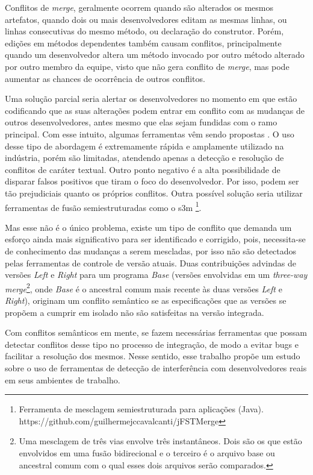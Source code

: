 \documentclass[sigconf,review]{acmart}
\begin{document}
Conflitos de \textit{merge}, geralmente ocorrem quando são alterados os mesmos artefatos, quando dois ou mais desenvolvedores editam as mesmas linhas, ou linhas consecutivas do mesmo método, ou declaração do construtor\cite{accioly2018understanding}. Porém, edições em métodos dependentes também causam conflitos, principalmente quando um desenvolvedor altera um método invocado por outro método alterado por outro membro da equipe, visto que não gera conflito de \textit{merge}, mas pode aumentar as chances de ocorrência de outros conflitos\cite{lima2014abordagem}.

Uma solução parcial seria alertar os desenvolvedores no momento em que estão codificando que as suas alterações podem entrar em conflito com as mudanças de outros desenvolvedores, antes mesmo que elas sejam fundidas com o ramo principal. Com esse intuito, algumas ferramentas vêm sendo propostas \cite{10.1145/1810295.1810339, 10.1145/2025113.2025139, article, 10.5555/2486788.2486884}. O uso desse tipo de abordagem é extremamente rápida e amplamente utilizado na indústria, porém são limitadas, atendendo apenas a detecção e resolução de conflitos de caráter textual. Outro ponto negativo é a alta possibilidade de disparar falsos positivos que tiram o foco do desenvolvedor. Por isso, podem ser tão prejudiciais quanto os próprios conflitos. Outra possível solução seria utilizar ferramentas de fusão semiestruturadas como o s3m \footnote{Ferramenta de mesclagem semiestruturada para aplicações (Java). https://github.com/guilhermejccavalcanti/jFSTMerge}. 


Mas esse não é o único problema, existe um tipo de conflito que demanda um esforço ainda mais significativo para ser identificado e corrigido,  pois, necessita-se de conhecimento das mudanças a serem mescladas, por isso não são detectados pelas ferramentas de controle de versão atuais. Duas contribuições advindas de versões \emph{Left} e \emph{Right} para um programa \emph{Base} (versões envolvidas em um \emph{three-way merge}\footnote{Uma mesclagem de três vias envolve três instantâneos. Dois são os que estão envolvidos em uma fusão bidirecional e o terceiro é o arquivo base ou ancestral comum com o qual esses dois arquivos serão comparados.}, onde \emph{Base} é o ancestral comum mais recente às duas versões \emph{Left} e \emph{Right}), originam um conflito semântico se as especificações que as versões se propõem a cumprir em isolado não são satisfeitas na versão integrada.\cite{Horwitz1989IntegratingNV}

Com conflitos semânticos em mente, se fazem necessárias ferramentas que possam detectar conflitos desse tipo no processo de integração, de modo a evitar bugs e facilitar a resolução dos mesmos. {\color{red}Nesse sentido, esse trabalho propõe um estudo sobre o uso de ferramentas de  detecção de interferência com desenvolvedores reais em seus ambientes de trabalho.}
\end{document}
